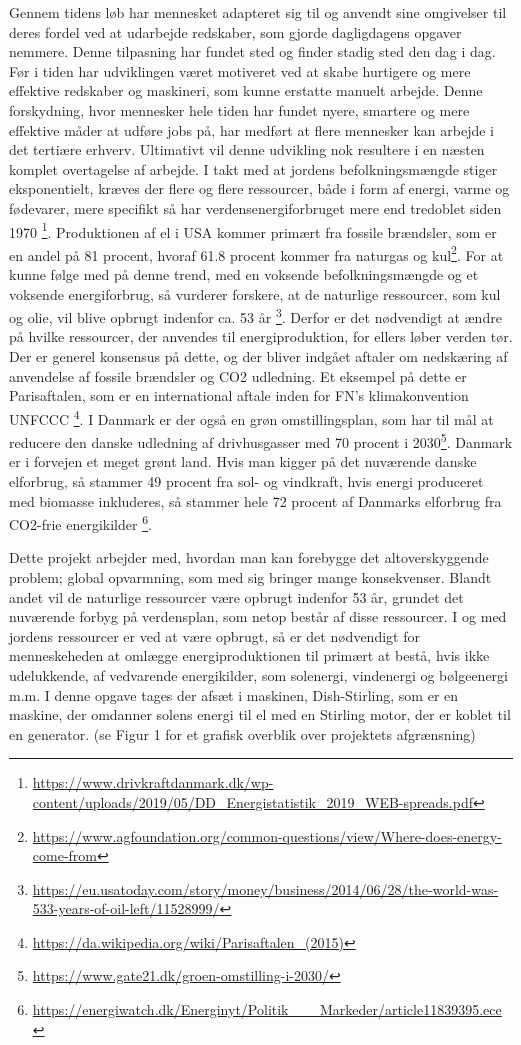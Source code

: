 \documentclass[SRC.tex]{subfiles}
\begin{document}
	Gennem tidens løb har mennesket adapteret sig til og anvendt sine omgivelser til deres fordel ved at udarbejde redskaber, som gjorde dagligdagens opgaver nemmere. Denne tilpasning har fundet sted og finder stadig sted den dag i dag. Før i tiden har udviklingen været motiveret ved at skabe hurtigere og mere effektive redskaber og maskineri, som kunne erstatte manuelt arbejde. Denne forskydning, hvor mennesker hele tiden har fundet nyere, smartere og mere effektive måder at udføre jobs på, har medført at flere mennesker kan arbejde i det tertiære erhverv. Ultimativt vil denne udvikling nok resultere i en næsten komplet overtagelse af arbejde. I takt med at jordens befolkningsmængde stiger eksponentielt, kræves der flere og flere ressourcer, både i form af energi, varme og fødevarer, mere specifikt så har verdensenergiforbruget mere end tredoblet siden 1970 \footnote{\url{https://www.drivkraftdanmark.dk/wp-content/uploads/2019/05/DD_Energistatistik_2019_WEB-spreads.pdf}}. Produktionen af el i USA kommer primært fra fossile brændsler, som er en andel på 81 procent, hvoraf 61.8 procent kommer fra naturgas og kul\footnote{\url{https://www.agfoundation.org/common-questions/view/Where-does-energy-come-from}}. For at kunne følge med på denne trend, med en voksende befolkningsmængde og et voksende energiforbrug, så vurderer forskere, at de naturlige ressourcer, som kul og olie, vil blive opbrugt indenfor ca. 53 år \footnote{\url{https://eu.usatoday.com/story/money/business/2014/06/28/the-world-was-533-years-of-oil-left/11528999/}}.  Derfor er det nødvendigt at ændre på hvilke ressourcer, der anvendes til energiproduktion, for ellers løber verden tør. Der er generel konsensus på dette, og der bliver indgået aftaler om nedskæring af anvendelse af fossile brændsler og CO2 udledning. Et eksempel på dette er Parisaftalen, som er en international aftale inden for FN’s klimakonvention UNFCCC \footnote{\url{https://da.wikipedia.org/wiki/Parisaftalen_(2015)}}. I Danmark er der også en grøn omstillingsplan, som har til mål at reducere den danske udledning af drivhusgasser med 70 procent i 2030\footnote{\url{https://www.gate21.dk/groen-omstilling-i-2030/}}. Danmark er i forvejen et meget grønt land. Hvis man kigger på det nuværende danske elforbrug, så stammer 49 procent fra sol- og vindkraft, hvis energi produceret med biomasse inkluderes, så stammer hele 72 procent af Danmarks elforbrug fra CO2-frie energikilder \footnote{\url{https://energiwatch.dk/Energinyt/Politik___Markeder/article11839395.ece}}.  
	
	Dette projekt arbejder med, hvordan man kan forebygge det altoverskyggende problem; global opvarmning, som med sig bringer mange konsekvenser. Blandt andet vil de naturlige ressourcer være opbrugt indenfor 53 år, grundet det nuværende forbyg på verdensplan, som netop består af disse ressourcer. I og med jordens ressourcer er ved at være opbrugt, så er det nødvendigt for menneskeheden at omlægge energiproduktionen til primært at bestå, hvis ikke udelukkende, af vedvarende energikilder, som solenergi, vindenergi og bølgeenergi m.m. I denne opgave tages der afsæt i maskinen, Dish-Stirling, som er en maskine, der omdanner solens energi til el med en Stirling motor, der er koblet til en generator. (se Figur 1 for et grafisk overblik over projektets afgrænsning) 
\end{document}
